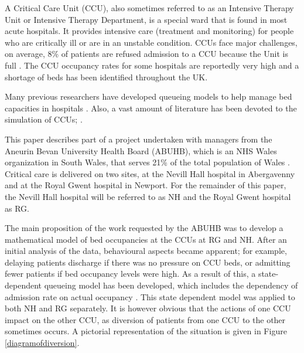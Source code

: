 \documentclass{article}
\begin{document}
A Critical Care Unit (CCU), also sometimes referred to as an Intensive Therapy Unit or Intensive Therapy Department, is a special ward that is found in most acute hospitals.
It provides intensive care (treatment and monitoring) for people who are critically ill or are in an unstable condition.
CCUs face major challenges, on average, 8\% of patients are refused admission to a CCU because the Unit is full \cite{Report}.
The CCU occupancy rates for some hospitals are reportedly very high \cite{Mitchell1995,Smith1995} and a shortage of beds has been identified throughout the UK.

Many previous researchers have developed queueing models to help manage bed capacities in hospitals \cite{Cooper1974,Dumas1984,Gallivan2011,Gorunescu2002a,Griffiths2012,Harper2002a}.
Also, a vast amount of literature has been devoted to the simulation of CCUs;  \cite{Cahill1999a,Costa2003,Griffiths2004a,Kim1999,Litvak2008,Shahani2008}.

This paper describes part of a project undertaken with managers from the Aneurin Bevan University Health Board (ABUHB), which is an NHS Wales organization in South Wales, that serves 21\% of the total population of Wales \cite{Board}.
Critical care is delivered on two sites, at the Nevill Hall hospital in Abergavenny and at the Royal Gwent hospital in Newport.
For the remainder of this paper, the Nevill Hall hospital will be referred to as NH and the Royal Gwent hospital as RG.

The main proposition of the work requested by the ABUHB was to develop a mathematical model of bed occupancies at the CCUs at RG and NH.
After an initial analysis of the data, behavioural aspects became apparent; for example, delaying patients discharge if there was no pressure on CCU beds, or admitting fewer patients if bed occupancy levels were high.
As a result of this, a state-dependent queueing model has been developed, which includes the dependency of admission rate on actual occupancy \cite{williams2015mathematical}.
This state dependent model was applied to both NH and RG separately.
It is however obvious that the actions of one CCU impact on the other CCU, as diversion of patients from one CCU to the other sometimes occurs.
A pictorial representation of the situation is given in Figure \ref{diagramofdiversion}.
\end{document}
